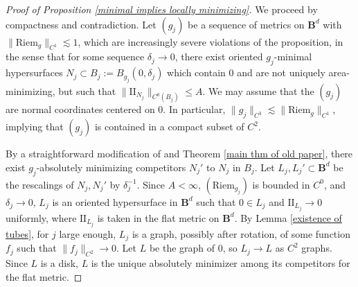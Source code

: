 \documentclass[reqno,11pt]{amsart}
\newcommand{\Ball}{\mathbf{B}}
\newcommand{\Two}{\mathrm{I\!I}}
\newcommand{\Riem}{\mathrm{Riem}}
\theoremstyle{definition}
\numberwithin{equation}{section}
\begin{document}
\begin{proof}[Proof of Proposition \ref{minimal implies locally minimizing}]
We proceed by compactness and contradiction.
Let $(g_j)$ be a sequence of metrics on $\Ball^d$ with $\|\Riem_g\|_{C^1} \lesssim 1$, which are increasingly severe violations of the proposition, in the sense that for some sequence $\delta_j \to 0$, there exist oriented $g_j$-minimal hypersurfaces $N_j \subset B_j := B_{g_j}(0, \delta_j)$ which contain $0$ and are not uniquely area-minimizing, but such that $\|\Two_{N_j}\|_{C^0(B_j)} \leq A$.
We may assume that the $(g_j)$ are normal coordinates centered on $0$.
In particular, $\|g_j\|_{C^3} \lesssim \|\Riem_g\|_{C^1}$, implying that $(g_j)$ is contained in a compact subset of $C^2$.


By a straightforward modification of \cite[Theorem 1.20]{Giusti77} and Theorem \ref{main thm of old paper}, there exist $g_j$-absolutely minimizing competitors $N_j'$ to $N_j$ in $B_j$.
Let $L_j, L_j' \subset \Ball^d$ be the rescalings of $N_j, N_j'$ by $\delta_j^{-1}$.
Since $A < \infty$, $(\Riem_{g_j})$ is bounded in $C^0$, and $\delta_j \to 0$, $L_j$ is an oriented hypersurface in $\Ball^d$ such that $0 \in L_j$ and $\Two_{L_j} \to 0$ uniformly, where $\Two_{L_j}$ is taken in the flat metric on $\Ball^d$.
By Lemma \ref{existence of tubes}, for $j$ large enough, $L_j$ is a graph, possibly after rotation, of some function $f_j$ such that $\|f_j\|_{C^2} \to 0$.
Let $L$ be the graph of $0$, so $L_j \to L$ as $C^2$ graphs.
Since $L$ is a disk, $L$ is the unique absolutely minimizer among its competitors for the flat metric.


\end{proof}
\end{document}
